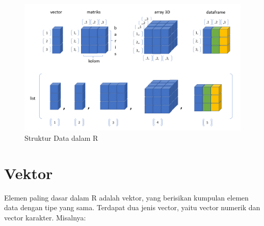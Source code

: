 \documentclass[
]{book}
\begin{document}
\begin{figure}

{\centering \includegraphics[width=1\linewidth]{./images/Bab3/Struktur_Data} 

}

\caption{Struktur Data dalam R}\label{fig:struktur-data}
\end{figure}

\hypertarget{vektor}{%
\section{Vektor}\label{vektor}}

Elemen paling dasar dalam R adalah vektor, yang berisikan kumpulan elemen data dengan tipe yang sama. Terdapat dua jenis vector, yaitu vector numerik dan vector karakter. Misalnya:
\end{document}
